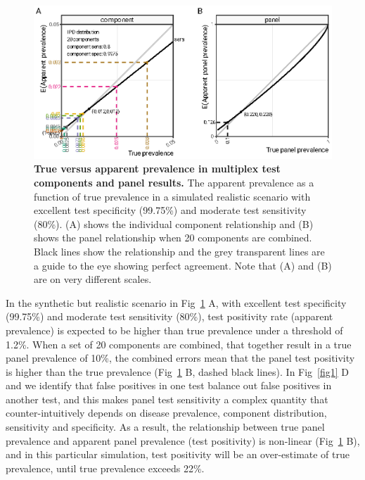 \documentclass[10pt,letterpaper]{article}
\providecommand{\DIFdelbegin}{} %
\providecommand{\DIFaddbeginFL}{} %
\providecommand{\DIFaddendFL}{} %
\providecommand{\DIFdelendFL}{} %
\newcommand{\DIFscaledelfig}{0.5}
\newlength{\DIFdelgraphicswidth} %
\newlength{\DIFdelgraphicsheight} %
\newcommand{\DIFaddincludegraphics}[2][]{{\color{blue}\fbox{\DIFOincludegraphics[#1]{#2}}}} %
\newcommand{\DIFdelincludegraphics}[2][]{%
\sbox{\DIFdelgraphicsbox}{\DIFOincludegraphics[#1]{#2}}%
\settoboxwidth{\DIFdelgraphicswidth}{\DIFdelgraphicsbox} %
\settoboxtotalheight{\DIFdelgraphicsheight}{\DIFdelgraphicsbox} %
\scalebox{\DIFscaledelfig}{%
\parbox[b]{\DIFdelgraphicswidth}{\usebox{\DIFdelgraphicsbox}\\[-\baselineskip] \rule{\DIFdelgraphicswidth}{0em}}\llap{\resizebox{\DIFdelgraphicswidth}{\DIFdelgraphicsheight}{%
\setlength{\unitlength}{\DIFdelgraphicswidth}%
\begin{picture}(1,1)%
\thicklines\linethickness{2pt} %
{\color[rgb]{1,0,0}\put(0,0){\framebox(1,1){}}}%
{\color[rgb]{1,0,0}\put(0,0){\line( 1,1){1}}}%
{\color[rgb]{1,0,0}\put(0,1){\line(1,-1){1}}}%
\end{picture}%
}\hspace*{3pt}}} %
} %
\DeclareRobustCommand{\DIFdelbegin}{\DIFOdelbegin \let\includegraphics\DIFdelincludegraphics} %
\DeclareRobustCommand{\DIFaddbeginFL}{\DIFOaddbeginFL \let\includegraphics\DIFaddincludegraphics} %
\DeclareRobustCommand{\DIFaddendFL}{\DIFOaddendFL \let\includegraphics\DIFOincludegraphics} %
\DeclareRobustCommand{\DIFdelendFL}{\DIFOaddendFL \let\includegraphics\DIFOincludegraphics} %
\begin{document}
\DIFdelbegin %
\DIFdelendFL \DIFaddbeginFL \begin{figure}[ht!]
\DIFaddendFL \centerline{\includegraphics{fig/fig3-true-apparent-prevalence-component-panels.eps}}
\caption{{\bf True versus apparent prevalence in multiplex test components and panel results.}
The apparent prevalence as a function of true prevalence in a simulated realistic scenario with excellent test specificity (99.75\%) and moderate test sensitivity (80\%). (A) shows the individual component relationship and (B) shows the panel relationship when 20 components are combined. Black lines show the relationship and the grey transparent lines are a guide to the eye showing perfect agreement. Note that (A) and (B) are on very different scales.
}
\label{fig3}
\end{figure}

In the synthetic but realistic scenario in Fig~\ref{fig3} A, with excellent test specificity (99.75\%) and moderate test sensitivity (80\%), test positivity rate (apparent prevalence) is expected to be higher than true prevalence under a threshold of 1.2\%. When a set of 20 components are combined, that together result in a true panel prevalence of 10\%, the combined errors mean that the panel test positivity is higher than the true prevalence (Fig~\ref{fig3} B, dashed black lines). In Fig~\ref{fig1} D and  we identify that false positives in one test balance out false positives in another test, and this makes panel test sensitivity a complex quantity that counter-intuitively depends on disease prevalence, component distribution, sensitivity and specificity. As a result, the relationship between true panel prevalence and apparent panel prevalence (test positivity) is non-linear (Fig~\ref{fig3} B), and in this particular simulation, test positivity will be an over-estimate of true prevalence, until true prevalence exceeds 22\%.
\end{document}
